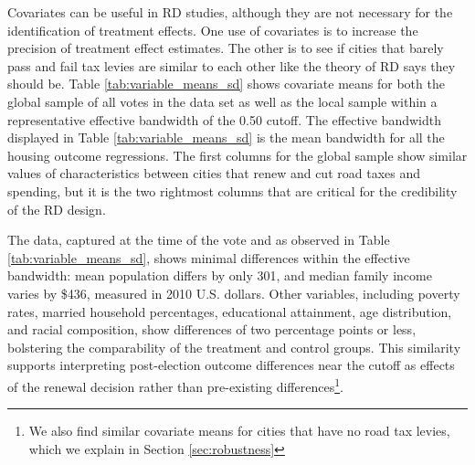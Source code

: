 Covariates can be useful in RD studies, although they are not necessary for the identification of treatment effects.  One use of covariates is to increase the precision of treatment effect estimates.  The other is to see if cities that barely pass and fail tax levies are similar to each other like the theory of RD says they should be. Table \ref{tab:variable_means_sd} shows covariate means for both the global sample of all votes in the data set as well as the local sample within a representative effective bandwidth of the 0.50 cutoff. The effective bandwidth displayed in Table \ref{tab:variable_means_sd} is the mean bandwidth for all the housing outcome regressions. The first columns for the global sample show similar values of characteristics between cities that renew and cut road taxes and spending, but it is the two rightmost columns that are critical for the credibility of the RD design.

The data, captured at the time of the vote and as observed in Table \ref{tab:variable_means_sd}, shows minimal differences within the effective bandwidth: mean population differs by only 301, and median family income varies by \$436, measured in 2010 U.S. dollars. Other variables, including poverty rates, married household percentages, educational attainment, age distribution, and racial composition, show differences of two percentage points or less, bolstering the comparability of the treatment and control groups. This similarity supports interpreting post-election outcome differences near the cutoff as effects of the renewal decision rather than pre-existing differences\footnote{We also find similar covariate means for cities that have no road tax levies, which we explain in Section \ref{sec:robustness}}.

